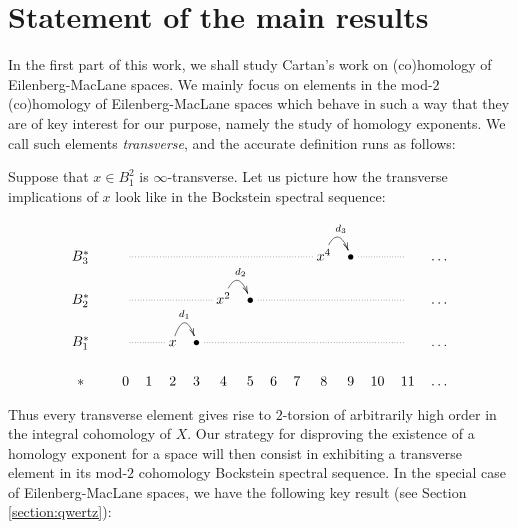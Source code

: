 \section{Statement of the main results}\label{section:main results}

In the first part of this work, we shall study Cartan's work \cite{Ca55} on (co)homology of Eilenberg-MacLane spaces. We mainly focus on elements in the mod-$2$ (co)homology of Eilenberg-MacLane spaces which behave in such a way that they are of key interest for our purpose, namely the study of homology exponents. We call such elements {\it transverse}, and the accurate definition runs as follows:

\begin{defn}
\label{defn_transverse_coH}

\end{defn}
\theoremstyle{definition}
\newtheorem*{defn_transverse_coH}{\mbox{\ref{defn_transverse_coH}.~Definition}}

Suppose that $x\in B_1^2$ is $\infty$-transverse. Let us picture how the transverse implications of $x$ look like in the Bockstein spectral sequence:

$$\xymatrix@C=0.2cm@R=0.5truecm{
B_3^* &&\ar@{.}[rrrrrrrr] & & & & & & & &x^4\ar@/^0.5truecm/[r]^-{d_3} &\bullet\ar@{.}[rr] & &  &\dots\\
B_2^* &&\ar@{.}[rrrr] & & & &x^2\ar@/^0.5truecm/[r]^-{d_2} &\bullet\ar@{.}[rrrrrr] & & & & & &  &\dots\\
B_1^* &&\ar@{.}[rr] & &x\ar@/^0.5truecm/[r]^-{d_1} &\bullet\ar@{.}[rrrrrrrr] & & & & & & & & &\dots\\
{*}&&0 &1 &2 &3 &4 &5 &6 &7 &8 &9 &10 &11 &\dots
}$$

\bigskip
Thus every transverse element gives rise to $2$-torsion of arbitrarily high order in the integral cohomology of $X$. Our strategy for disproving the existence of a homology exponent for a space will then consist in exhibiting a transverse element in its mod-$2$ cohomology Bockstein spectral sequence. In the special case of Eilenberg-MacLane spaces, we have the following key result (see Section \ref{section:qwertz}):

\begin{thm}\label{t:transversity for Eilenberg-MacLane spaces}
\label{thm_main_technical}

\end{thm}
\theoremstyle{plain}
\newtheorem*{thm_main_technical}{\mbox{\ref{thm_main_technical}.~Theorem}}

